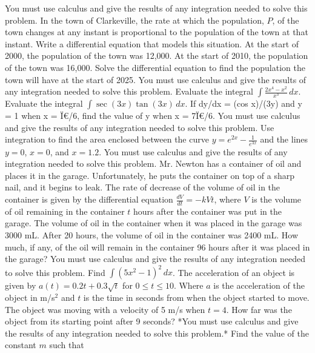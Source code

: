 \documentclass[12pt,addpoints]{exam}
\begin{document}
\begin{questions}
You must use calculus and give the results of any integration needed to solve this problem.
\fillwithlines{3cm}
\question[5] In the town of Clarkeville, the rate at which the population, \( P \), of the town changes at any instant is proportional to the population of the town at that instant. Write a differential equation that models this situation.
\fillwithlines{3cm}
\question[5] At the start of 2000, the population of the town was 12,000. At the start of 2010, the population of the town was 16,000. Solve the differential equation to find the population the town will have at the start of 2025. You must use calculus and give the results of any integration needed to solve this problem.
\fillwithlines{3cm}
\question[5] Evaluate the integral \(\int \frac{2x^4 - x^2}{x^3} \, dx\).
\fillwithlines{3cm}
\question[5] Evaluate the integral \(\int \sec(3x) \tan(3x) \, dx\).
\fillwithlines{3cm}
\question[5] If dy/dx = (cos x)/(3y) and y = 1 when x = Ï€/6, find the value of y when x = 7Ï€/6. You must use calculus and give the results of any integration needed to solve this problem.
\fillwithlines{3cm}
\question[5] Use integration to find the area enclosed between the curve \( y = e^{2x} - \frac{1}{e^{3x}} \) and the lines \( y = 0 \), \( x = 0 \), and \( x = 1.2 \). You must use calculus and give the results of any integration needed to solve this problem.
\fillwithlines{3cm}
\question[5] Mr. Newton has a container of oil and places it in the garage. Unfortunately, he puts the container on top of a sharp nail, and it begins to leak. The rate of decrease of the volume of oil in the container is given by the differential equation \(\frac{dV}{dt} = -kVt\), where \(V\) is the volume of oil remaining in the container \(t\) hours after the container was put in the garage. The volume of oil in the container when it was placed in the garage was 3000 mL. After 20 hours, the volume of oil in the container was 2400 mL. How much, if any, of the oil will remain in the container 96 hours after it was placed in the garage? You must use calculus and give the results of any integration needed to solve this problem.
\fillwithlines{3cm}
\question[5] Find \( \int (5x^2 - 1)^2 \, dx \).
\fillwithlines{3cm}
\question[5] The acceleration of an object is given by \( a(t) = 0.2t + 0.3\sqrt{t} \) for \( 0 \leq t \leq 10 \). Where \( a \) is the acceleration of the object in m/s\(^2\) and \( t \) is the time in seconds from when the object started to move. The object was moving with a velocity of 5 m/s when \( t = 4 \). How far was the object from its starting point after 9 seconds? *You must use calculus and give the results of any integration needed to solve this problem.*
\fillwithlines{3cm}
\question[5] Find the value of the constant \( m \) such that


\end{questions}
\end{document}
